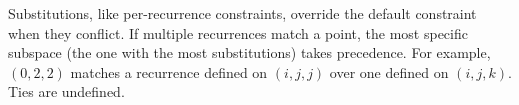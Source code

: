 \documentclass[sigplan, nonacm]{acmart}
\begin{document}

Substitutions, like per-recurrence constraints, override the default constraint when they conflict. If multiple recurrences match a point, the most specific subspace (the one with the most substitutions) takes precedence. For example, \((0,2,2)\) matches a recurrence defined on \((i,j,j)\) over one defined on \((i,j,k)\). Ties are undefined.


\end{document}
